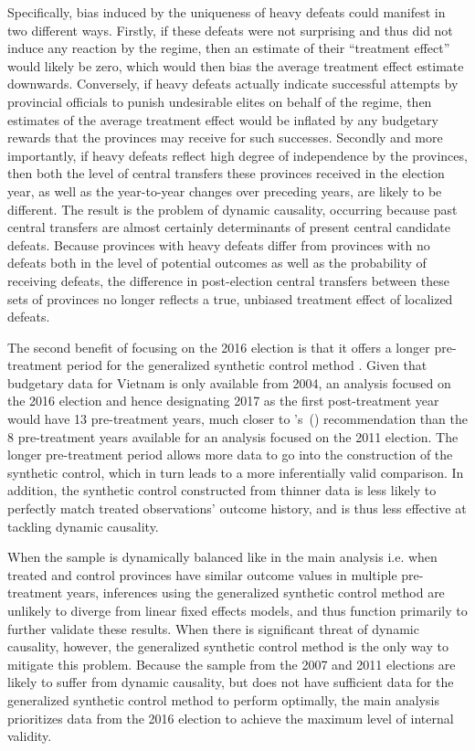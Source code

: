 \documentclass[12pt]{article}
\newcommand\citepos[1]{\citeauthor{#1}'s\ (\citeyear{#1})}
\newcommand{\1}{\mathbbm{1}}
\begin{document}
Specifically, bias induced by the uniqueness of heavy defeats could manifest in two different ways. Firstly, if these defeats were not surprising and thus did not induce any reaction by the regime, then an estimate of their ``treatment effect'' would likely be zero, which would then bias the average treatment effect estimate downwards. Conversely, if heavy defeats actually indicate successful attempts by provincial officials to punish undesirable elites on behalf of the regime, then estimates of the average treatment effect would be inflated by any budgetary rewards that the provinces may receive for such successes. Secondly and more importantly, if heavy defeats reflect high degree of independence by the provinces, then both the level of central transfers these provinces received in the election year, as well as the year-to-year changes over preceding years, are likely to be different. The result is the problem of dynamic causality, occurring because past central transfers are almost certainly determinants of present central candidate defeats. Because provinces with heavy defeats differ from provinces with no defeats both in the level of potential outcomes as well as the probability of receiving defeats, the difference in post-election central transfers between these sets of provinces no longer reflects a true, unbiased treatment effect of localized defeats.

The second benefit of focusing on the 2016 election is that it offers a longer pre-treatment period for the generalized synthetic control method \citep{Xu2017gsynth}. Given that budgetary data for Vietnam is only available from 2004, an analysis focused on the 2016 election and hence designating 2017 as the first post-treatment year would have 13 pre-treatment years, much closer to \citepos{Abadie2010} recommendation than the 8 pre-treatment years available for an analysis focused on the 2011 election. The longer pre-treatment period allows more data to go into the construction of the synthetic control, which in turn leads to a more inferentially valid comparison. In addition, the synthetic control constructed from thinner data is less likely to perfectly match treated observations' outcome history, and is thus less effective at tackling dynamic causality.

When the sample is dynamically balanced like in the main analysis i.e. when treated and control provinces have similar outcome values in multiple pre-treatment years, inferences using the generalized synthetic control method are unlikely to diverge from linear fixed effects models, and thus function primarily to further validate these results. When there is significant threat of dynamic causality, however, the generalized synthetic control method is the only way to mitigate this problem. Because the sample from the 2007 and 2011 elections are likely to suffer from dynamic causality, but does not have sufficient data for the generalized synthetic control method to perform optimally, the main analysis prioritizes data from the 2016 election to achieve the maximum level of internal validity.
\end{document}
